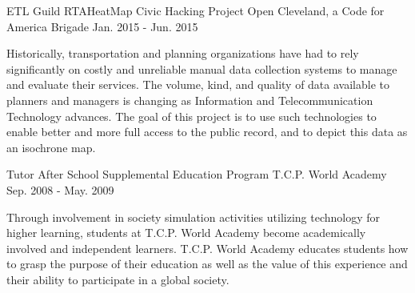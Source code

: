 \begin{cventries}
  \cventry
    {ETL Guild} %
    {RTAHeatMap Civic Hacking Project} %
    {Open Cleveland, a Code for America Brigade} %
    {Jan. 2015 - Jun. 2015} %
    {
      \begin{cvparagraph}
        Historically, transportation and planning organizations have had to rely significantly on costly and unreliable manual data collection systems to manage and evaluate their services. The volume, kind, and quality of data available to planners and managers is changing as Information and Telecommunication Technology advances. The goal of this project is to use such technologies to enable better and more full access to the public record, and to depict this data as an isochrone map.
      \end{cvparagraph}
    }

  \cventry
    {Tutor} %
    {After School Supplemental Education Program} %
    {T.C.P. World Academy} %
    {Sep. 2008 - May. 2009} %
    {
      \begin{cvparagraph}
        Through involvement in society simulation activities utilizing technology for higher learning, students at T.C.P. World Academy become academically involved and independent learners. T.C.P. World Academy educates students how to grasp the purpose of their education as well as the value of this experience and their ability to participate in a global society.
      \end{cvparagraph}
    }

\end{cventries}
